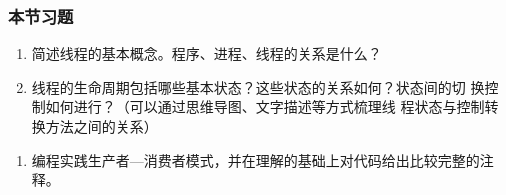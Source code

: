 \begin{frame}
  \frametitle{本节习题}


  \begin{enumerate}
  \item 简述线程的基本概念。程序、进程、线程的关系是什么？
  \item 线程的生命周期包括哪些基本状态？这些状态的关系如何？状态间的切
    换控制如何进行？（{\kai\Blue 可以通过思维导图、文字描述等方式梳理线
      程状态与控制转换方法之间的关系}）
  \end{enumerate}

  
  \begin{enumerate}
  \item 编程实践生产者—消费者模式，并在理解的基础上对代码给出比较完整的注释。
  \end{enumerate}
  
\end{frame}




